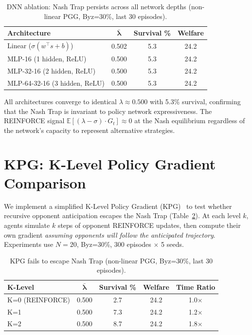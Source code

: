 \documentclass{article}
\begin{document}
\begin{table}[h]
\centering
\caption{DNN ablation: Nash Trap persists across all network depths (non-linear PGG, Byz=30\%, last 30 episodes).}
\label{tab:dnn_ablation}
\begin{tabular}{lccc}
\toprule
\textbf{Architecture} & $\boldsymbol{\bar{\lambda}}$ & \textbf{Survival \%} & \textbf{Welfare} \\
\midrule
Linear ($\sigma(w^\top s + b)$) & 0.502 & 5.3 & 24.2 \\
MLP-16 (1 hidden, ReLU) & 0.500 & 5.3 & 24.2 \\
MLP-32-16 (2 hidden, ReLU) & 0.500 & 5.3 & 24.2 \\
MLP-64-32-16 (3 hidden, ReLU) & 0.500 & 5.3 & 24.2 \\
\bottomrule
\end{tabular}
\end{table}

\noindent All architectures converge to identical $\lambda \approx 0.500$ with 5.3\% survival, confirming that the Nash Trap is invariant to policy network expressiveness.
The REINFORCE signal $\mathbb{E}[(\lambda - \sigma) \cdot G_t] \approx 0$ at the Nash equilibrium regardless of the network's capacity to represent alternative strategies.

\section{KPG: K-Level Policy Gradient Comparison}
\label{app:kpg}

We implement a simplified K-Level Policy Gradient (KPG)~\citep{somani2024kpg} to test whether recursive opponent anticipation escapes the Nash Trap (Table~\ref{tab:kpg}).
At each level $k$, agents simulate $k$ steps of opponent REINFORCE updates, then compute their own gradient \emph{assuming opponents will follow the anticipated trajectory}.
Experiments use $N{=}20$, Byz=30\%, 300 episodes $\times$ 5 seeds.

\begin{table}[h]
\centering
\caption{KPG fails to escape Nash Trap (non-linear PGG, Byz=30\%, last 30 episodes).}
\label{tab:kpg}
\begin{tabular}{lcccc}
\toprule
\textbf{K-Level} & $\boldsymbol{\bar{\lambda}}$ & \textbf{Survival \%} & \textbf{Welfare} & \textbf{Time Ratio} \\
\midrule
K=0 (REINFORCE) & 0.500 & 2.7 & 24.2 & 1.0$\times$ \\
K=1 & 0.500 & 7.3 & 24.2 & 1.2$\times$ \\
K=2 & 0.500 & 8.7 & 24.2 & 1.8$\times$ \\
\bottomrule
\end{tabular}
\end{table}
\end{document}
